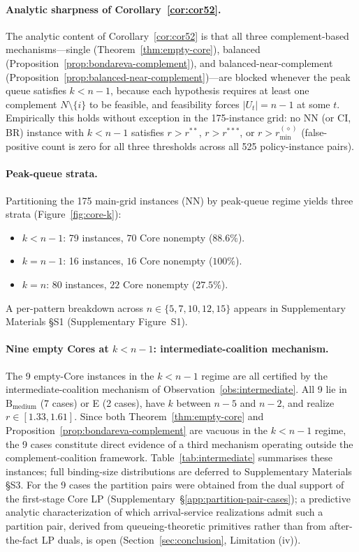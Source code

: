 \documentclass[11pt]{article}
\theoremstyle{plain}
\theoremstyle{definition}
\theoremstyle{remark}
\begin{document}
\paragraph{Analytic sharpness of Corollary~\ref{cor:cor52}.} The analytic content of Corollary~\ref{cor:cor52} is that all three complement-based mechanisms---single (Theorem~\ref{thm:empty-core}), balanced (Proposition~\ref{prop:bondareva-complement}), and balanced-near-complement (Proposition~\ref{prop:balanced-near-complement})---are blocked whenever the peak queue satisfies $k<n-1$, because each hypothesis requires at least one complement $N\setminus\{i\}$ to be feasible, and feasibility forces $|U_t|=n-1$ at some $t$. Empirically this holds without exception in the 175-instance grid: no NN (or CI, BR) instance with $k<n-1$ satisfies $r>r^{\ast\ast}$, $r>r^{\ast\ast\ast}$, or $r>r^{(\diamond)}_{\min}$ (false-positive count is zero for all three thresholds across all 525 policy-instance pairs).

\paragraph{Peak-queue strata.} Partitioning the 175 main-grid instances (NN) by peak-queue regime yields three strata (Figure~\ref{fig:core-k}):
\begin{itemize}
  \item $k<n-1$: 79 instances, $70$ Core nonempty ($88.6\%$).
  \item $k=n-1$: 16 instances, $16$ Core nonempty ($100\%$).
  \item $k=n$:   80 instances, $22$ Core nonempty ($27.5\%$).
\end{itemize}
A per-pattern breakdown across $n\in\{5,7,10,12,15\}$ appears in Supplementary Materials \S S1 (Supplementary Figure~S1).

\paragraph{Nine empty Cores at $k<n-1$: intermediate-coalition mechanism.} The 9 empty-Core instances in the $k<n-1$ regime are all certified by the intermediate-coalition mechanism of Observation~\ref{obs:intermediate}. All 9 lie in $\text{B}_{\text{medium}}$ (7 cases) or E (2 cases), have $k$ between $n-5$ and $n-2$, and realize $r\in[1.33,1.61]$. Since both Theorem~\ref{thm:empty-core} and Proposition~\ref{prop:bondareva-complement} are vacuous in the $k<n-1$ regime, the 9 cases constitute direct evidence of a third mechanism operating outside the complement-coalition framework. Table~\ref{tab:intermediate} summarises these instances; full binding-size distributions are deferred to Supplementary Materials \S S3. For the 9 cases the partition pairs were obtained from the dual support of the first-stage Core LP (Supplementary~\S\ref{app:partition-pair-cases}); a predictive analytic characterization of which arrival-service realizations admit such a partition pair, derived from queueing-theoretic primitives rather than from after-the-fact LP duals, is open (Section~\ref{sec:conclusion}, Limitation (iv)).
\end{document}
